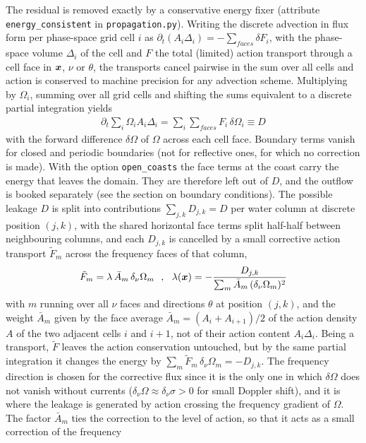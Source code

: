 \documentclass[12pt]{article}
\newcommand{\beq}  { \begin{eqnarray} }
\newcommand{\eeq}  { \end{eqnarray}}
\renewcommand{\v}[1]{{\mbox{\boldmath$ #1 $}}}  %
\newcommand{\pt}[1]{{\partial_t #1}}
\begin{document}
The residual is removed exactly by a conservative energy fixer
(attribute \verb|energy_consistent| in \verb|propagation.py|). Writing the
discrete advection in flux form per phase-space grid cell $i$ as
$\pt{(A_i \Delta_i)} = -\sum_{faces} \delta F_i$, with the phase-space
volume $\Delta_i$ of the cell and $F$ the total (limited) action transport
through a cell face in $\v x$, $\nu$ or $\theta$, the transports cancel
pairwise in the sum over all cells and action is conserved to machine
precision for any advection scheme. Multiplying by $\Omega_i$, summing over
all grid cells and shifting the sums equivalent to a discrete partial
integration yields
\beq \label{eq:edefect}
 \pt{} \sum_i \Omega_i A_i \Delta_i = \sum_i \sum_{faces} F_i \, \delta \Omega_i
 \equiv D
\eeq
with the forward difference $\delta \Omega$ of $\Omega$ across each cell
face. Boundary terms vanish for closed and periodic boundaries (not for
reflective ones, for which no correction is made).
With the option \verb|open_coasts| the face terms at the coast carry the
energy that leaves the domain.
They are therefore left out of $D$, and the outflow is booked separately
(see the section on boundary conditions). The possible leakage $D$
is split into contributions $\sum_{j,k} D_{j,k} = D$ per water column at
discrete position $(j,k)$, with the shared horizontal face terms split
half-half between neighbouring columns, and each $D_{j,k}$ is cancelled by a
small corrective action transport $\tilde F_m$ across the frequency faces of
that column,
\beq \label{eq:efix}
 \tilde F_m = \lambda \, \bar A_m \, \delta_\nu \Omega_m ~~,~~
 \lambda(\v x) = - \frac{ D_{j,k} }
                       { \sum_m \bar A_m \, (\delta_\nu \Omega_m)^2 }
\eeq
with $m$ running over all $\nu$ faces and directions $\theta$ at position
$(j,k)$, and the weight $\bar A_m$ given by the face average
$\bar A_m = (A_i + A_{i+1})/2$ of the action density $A$ of the two adjacent
cells $i$ and $i+1$, not of their action content $A_i \Delta_i$. Being a transport, $\tilde F$ leaves the
action conservation untouched, but by the same partial integration it changes
the energy by $\sum_m \tilde F_m \, \delta_\nu \Omega_m = -D_{j,k}$. The
frequency direction is chosen for the corrective flux since it is the only
one in which $\delta \Omega$ does not vanish without currents
($\delta_\nu \Omega \approx \delta_\nu \sigma > 0$ for small Doppler
shift), and it is where the leakage is generated by action crossing the
frequency gradient of $\Omega$. The factor $\bar A_m$ ties the correction to
the level of action, so that it acts as a small correction of the frequency
\end{document}
